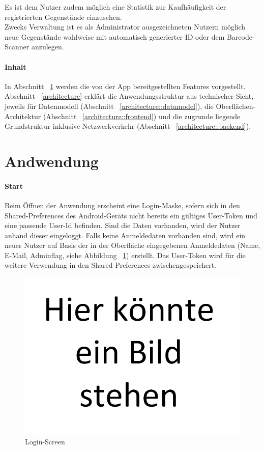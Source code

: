 \documentclass{scrartcl}
\begin{document}
		Es ist dem Nutzer zudem möglich eine Statistik zur Kaufhäufigkeit der registrierten Gegenstände einzusehen. \\
		Zwecks Verwaltung ist es als Administrator ausgezeichneten Nutzern möglich neue Gegenstände wahlweise mit automatisch generierter ID oder dem Barcode-Scanner anzulegen.
		
		\paragraph*{Inhalt}
		In Abschnitt ~\ref{features} werden die von der App bereitgestellten Features vorgestellt. Abschnitt ~\ref{architecture} erklärt die Anwendungsstruktur aus technischer Sicht, jeweils für Datenmodell (Abschnitt ~\ref{architecture::datamodel}), die Oberflächen-Architektur (Abschnitt ~\ref{architecture::frontend}) und die zugrunde liegende Grundstruktur inklusive Netzwerkverkehr (Abschnitt ~\ref{architecture::backend}).
		
		
	\section{Andwendung} \label{features}
		\paragraph*{Start}
		Beim Öffnen der Anwendung erscheint eine Login-Maske, sofern sich in den Shared-Preferences des Android-Geräts nicht bereits ein gültiges User-Token und eine passende User-Id befinden. Sind die Daten vorhanden, wird der Nutzer anhand dieser eingeloggt. Falls keine Anmeldedaten vorhanden sind, wird ein neuer Nutzer auf Basis der in der Oberfläche eingegebenen Anmeldedaten (Name, E-Mail, Adminflag, siehe Abbildung ~\ref{loginscreen}) erstellt. Das User-Token wird für die weitere Verwendung in den Shared-Preferences zwischengespeichert.
	
		\begin{figure}[!h]
			\centering
			\includegraphics[scale=0.5]{./figures/placeholder.png}
			\caption{Login-Screen}
			\label{loginscreen}
		\end{figure}
	
\end{document}
